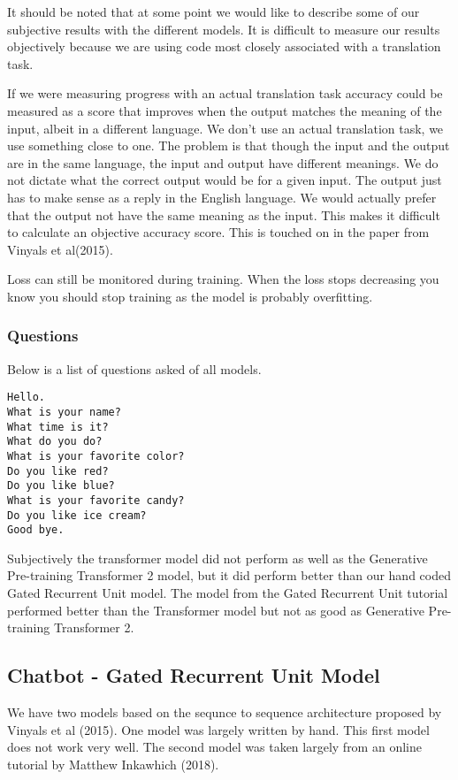It should be noted that at some point we would like to describe some of our subjective results with the different models. It is difficult to measure our results objectively because we are using code most closely associated with a translation task. 

If we were measuring progress with an actual translation task accuracy could be measured as a score that improves when the output matches the meaning of the input, albeit in a different language. We don't use an actual translation task, we use something close to one. The problem is that though the input and the output are in the same language, the input and output have different meanings. We do not dictate what the correct output would be for a given input. The output just has to make sense as a reply in the English language. We would actually prefer that the output not have the same meaning as the input. This makes it difficult to calculate an objective accuracy score. This is touched on in the paper from Vinyals et al(2015)\cite{DBLP:journals/corr/VinyalsL15}.

Loss can still be monitored during training. When the loss stops decreasing you know you should stop training as the model is probably overfitting.

\subsubsection*{Questions}
Below is a list of questions asked of all models.

\begin{verbatim}
Hello.
What is your name? 
What time is it?
What do you do?
What is your favorite color?
Do you like red?
Do you like blue?
What is your favorite candy?
Do you like ice cream?
Good bye.
\end{verbatim}

Subjectively the transformer model did not perform as well as the Generative Pre-training Transformer 2 model, but it did perform better than our hand coded Gated Recurrent Unit model. The model from the Gated Recurrent Unit tutorial performed better than the Transformer model but not as good as Generative Pre-training Transformer 2.


\subsection{Chatbot - Gated Recurrent Unit Model}
We have two models based on the sequnce to sequence architecture proposed by Vinyals et al (2015)\cite{DBLP:journals/corr/VinyalsL15}. One model was largely written by hand. This first model does not work very well. The second model was taken largely from an online tutorial by Matthew Inkawhich (2018)\cite{2018Inkawhich}.

